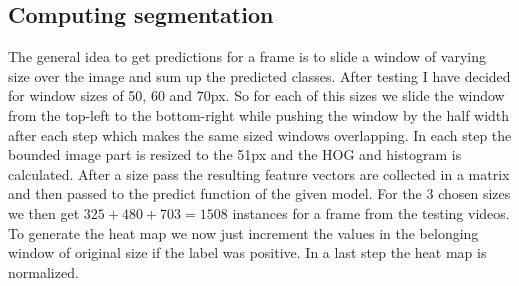 \subsection{Computing segmentation} %
\label{sub:computing_segmentation}
The general idea to get predictions for a frame is to slide a window of varying size over the image and sum up the predicted classes. After testing I have decided for window sizes of 50, 60 and 70px. So for each of this sizes we slide the window from the top-left to the bottom-right while pushing the window by the half width after each step which makes the same sized windows overlapping. In each step the bounded image part is resized to the 51px and the HOG and histogram is calculated. After a size pass the resulting feature vectors are collected in a matrix and then passed to the predict function of the given model. For the 3 chosen sizes we then get $325 + 480 + 703 = 1508$ instances for a frame from the testing videos. To generate the heat map we now just increment the values in the belonging window of original size if the label was positive. In a last step the heat map is normalized.

